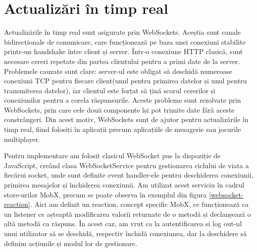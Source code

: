 \section{Actualizări în timp real}

Actualizările în timp real sunt asigurate prin WebSockets. Aceștia sunt canale bidirecționale de comunicare, care funcționează pe baza unei conexiuni stabilite printr-un handshake între client și server. Într-o conexiune HTTP clasică, sunt necesare cereri repetate din partea clientului pentru a primi date de la server. Problemele cauzate sunt clare: server-ul este obligat să deschidă numeroase conexiuni TCP pentru fiecare client(unul pentru primirea datelor și unul pentru transmiterea datelor), iar clientul este forțat să țină scorul cererilor și conexiunilor pentru a corela răspunsurile.  Aceste probleme sunt rezolvate prin WebSockets, prin care cele două componente își pot trimite date fără aceste constrângeri. Din acest motiv, WebSockets sunt de ajutor pentru actualizările în timp real, fiind folosiți în aplicații precum aplicațiile de mesagerie sau jocurile multiplayer\cite{websockets-protocol}.

Pentru implementare am folosit clasicul WebSocket pus la dispoziție de JavaScript, creând clasa WebSocketService pentru gestionarea ciclului de viata a fiecărui socket, unde sunt definite event handler-ele pentru deschiderea conexiunii, primirea mesajelor și închiderea conexiunii. Am utilizat acest serviciu în cadrul store-urilor MobX, precum se poate observa în exemplul din figura \ref{websocket-reaction}. Aici am definit un reaction, concept specific MobX, ce funcționează ca un listener ce așteaptă modificarea valorii returnate de o metodă și declanșează o altă metodă ca răspuns. În acest caz, am vrut ca la autentificarea si log out-ul unui utilizator să se deschidă, respectiv închidă conexiunea, dar la deschidere să definim acțiunile și modul lor de gestionare.


